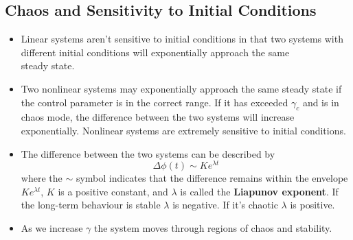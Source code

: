 \documentclass{article}
\begin{document}
\subsection{Chaos and Sensitivity to Initial Conditions}

\begin{itemize}
  \item Linear systems aren't sensitive to initial conditions in that two systems with different initial conditions will exponentially approach the same \\ steady state.

  \item Two nonlinear systems may exponentially approach the same steady state if the control parameter is in the correct range. If it has exceeded $\gamma_c$ and is in chaos mode, the difference between the two systems will increase exponentially. Nonlinear systems are extremely sensitive to initial conditions.

  \item The difference between the two systems can be described by \[\Delta \phi(t) \sim K e^{\lambda t}\] where the $\sim$ symbol indicates that the difference remains within the envelope $K e^{\lambda t}$, $K$ is a positive constant, and $\lambda$ is called the \textbf{Liapunov exponent}. If the long-term behaviour is stable $\lambda$ is negative. If it's chaotic $\lambda$ is positive.

  \item As we increase $\gamma$ the system moves through regions of chaos and stability.
\end{itemize}
\end{document}
